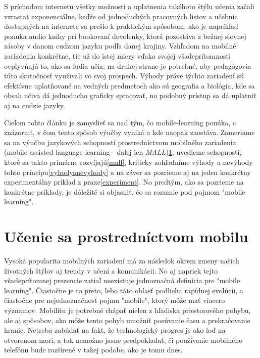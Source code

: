 \documentclass[10pt,oneside,slovak,a4paper]{article}
\begin{document}
S príchodom internetu všetky možnosti a uplatnenia takéhoto štýlu učenia začali vzrastať exponenciálne, keďže od jednoduchých pracovných listov a učebníc dostupných na internete sa prešlo k praktickým spôsobom, ako je napríklad ponuka audio knihy pri bookovaní dovolenky, ktorá pozostáva z bežnej slovnej zásoby v danom cudzom jazyku podľa danej krajiny. Vzhľadom na mobilné zariadenia konkrétne, tie už do istej miery vďaka svojej všadeprítomnosti ovplyvňujú to, ako sa ľudia učia; na druhej strane je potrebné, aby pedagógovia túto skutočnosť využívali vo svoj prospech\cite{KukulskaHulme2009}. Výhody práve týchto zariadení sú efektívne uplatňované na vedných predmetoch ako sú geografia a biológia, kde sa obsah učiva dá jednoducho graficky spracovať, no podobný prístup sa dá uplatniť aj na cudzie jazyky.

Cieľom tohto článku je zamyslieť sa nad tým, čo mobile-learning ponúka, a znázorniť, v čom tento spôsob výučby vyniká a kde naopak zaostáva. Zameriame sa na výučbu jazykových schopností prostredníctvom mobilného zariadenia (mobile assisted language learning - ďalej len \emph{MALL})\ref{ml}, uvedieme schopnosti, ktoré sa takto primárne rozvíjajú\ref{mall}, kriticky zohľadníme výhody a nevýhody tohto princípu\ref{vyhodyanevyhody} a na záver sa pozrieme aj na jeden konkrétny experimentálny príklad z praxe\ref{experiment}. No predtým, ako sa pozrieme na konkrétne príklady, je dôležité si objasniť, čo sa rozumie pod pojmom "mobile learning".


\section{Učenie sa prostredníctvom mobilu} \label{ml}

Vysoká popularita mobilných zariadení má za následok okrem zmeny našich životných štýlov aj trendy v učení a komunikácii. No aj napriek tejto všadeprítomnej prezencie zatiaľ neexistuje jednoznačná definícia pre "mobile learning"\cite{Kim2012}. Čiastočne je to preto, lebo táto oblasť podlieha rapídnej evolúcii, a čiastočne pre nejednoznačnosť pojmu "mobile", ktorý môže mať viacero významov\cite{KukulskaHulme2009}. Mobilitu je potrebné chápať nielen z hľadiska priestorového pohybu, ale aj spôsobov, ako môže tento pohyb umožniť posúvanie času a prekračovanie hraníc\cite{KukulskaHulme2009}. Netreba zabúdať na fakt, že technologický progres je ako loď na otvorenom mori, a tak nemožno jasne predpokladať, či používanie mobilného telefónu bude rozšírené v takej podobe, ako je tomu dnes. 
\end{document}
